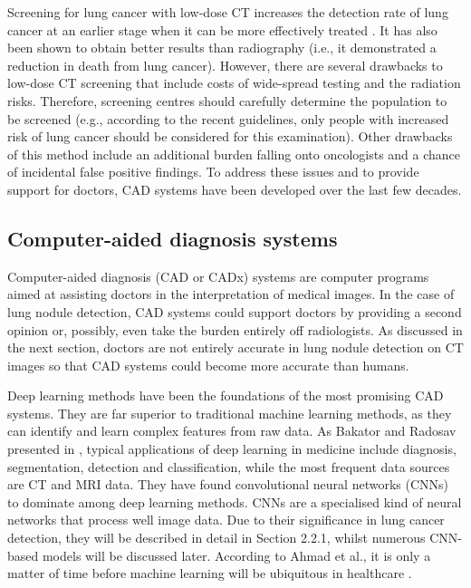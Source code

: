\documentclass[12pt]{article}
\begin{document}
Screening for lung cancer with low-dose CT increases the detection rate of lung cancer at an earlier stage when it can be more effectively treated \citep{caroline2014lung}. It has also been shown to obtain better results than radiography (i.e., it demonstrated a reduction in death from lung cancer). However, there are several drawbacks to low-dose CT screening that include costs of wide-spread testing and the radiation risks. Therefore, screening centres should carefully determine the population to be screened (e.g., according to the recent guidelines, only people with increased risk of lung cancer should be considered for this examination). Other drawbacks of this method include an additional burden falling onto oncologists and a chance of incidental false positive findings. To address these issues and to provide support for doctors, CAD systems have been developed over the last few decades.

\subsection{Computer-aided diagnosis systems}
Computer-aided diagnosis (CAD or CADx) systems are computer programs aimed at assisting doctors in the interpretation of medical images. In the case of lung nodule detection, CAD systems could support doctors by providing a second opinion or, possibly, even take the burden entirely off radiologists. As discussed in the next section, doctors are not entirely accurate in lung nodule detection on CT images so that CAD systems could become more accurate than humans.

Deep learning methods have been the foundations of the most promising CAD systems. They are far superior to traditional machine learning methods, as they can identify and learn complex features from raw data. As Bakator and Radosav presented in \citep{bakator2018deep}, typical applications of deep learning in medicine include diagnosis, segmentation, detection and classification, while the most frequent data sources are CT and MRI data. They have found convolutional neural networks (CNNs) to dominate among deep learning methods. CNNs are a specialised kind of neural networks that process well image data. Due to their significance in lung cancer detection, they will be described in detail in Section 2.2.1, whilst numerous CNN-based models will be discussed later. According to Ahmad et al., it is only a matter of time before machine learning will be ubiquitous in healthcare \citep{ahmad2018interpretable}.
\end{document}

